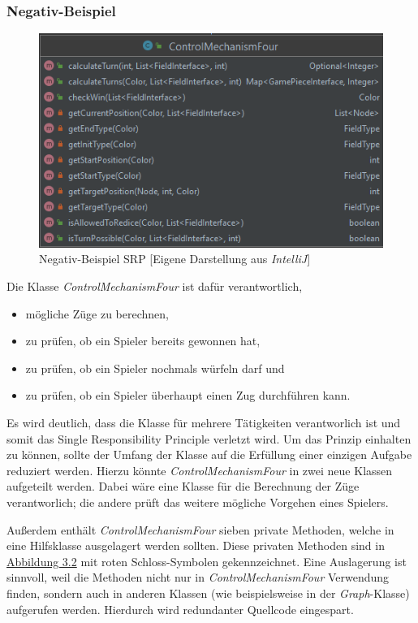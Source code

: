 \subsubsection{Negativ-Beispiel}
\begin{figure}[htbp]
\centering
\centerline{\includegraphics[scale=.6]{negativbeispiel_srp}}
\caption{Negativ-Beispiel SRP [Eigene Darstellung aus \emph{IntelliJ}]}
\label{fig:negativbeispiel_srp}
\end{figure}
\newpage
\noindent Die Klasse \emph{ControlMechanismFour} ist dafür verantwortlich, 
\begin{itemize}
\item mögliche Züge zu berechnen,
\item zu prüfen, ob ein Spieler bereits gewonnen hat,
\item zu prüfen, ob ein Spieler nochmals würfeln darf und
\item zu prüfen, ob ein Spieler überhaupt einen Zug durchführen kann.
\end{itemize}


\noindent Es wird deutlich, dass die Klasse für mehrere Tätigkeiten verantworlich ist und somit das Single Responsibility Principle verletzt wird. Um das Prinzip einhalten zu können, sollte der Umfang der Klasse auf die Erfüllung einer einzigen Aufgabe reduziert werden. Hierzu könnte \emph{ControlMechanismFour} in zwei neue Klassen aufgeteilt werden. Dabei wäre eine Klasse für die Berechnung der Züge verantworlich; die andere prüft das weitere mögliche Vorgehen eines Spielers. 

Außerdem enthält \emph{ControlMechanismFour} sieben private Methoden, welche in eine Hilfsklasse ausgelagert werden sollten. Diese privaten Methoden sind in \hyperref[fig:negativbeispiel_srp]{Abbildung 3.2} mit roten Schloss-Symbolen gekennzeichnet. Eine Auslagerung ist sinnvoll, weil die Methoden nicht nur in \emph{ControlMechanismFour} Verwendung finden, sondern auch in anderen Klassen (wie beispielsweise in der \emph{Graph}-Klasse) aufgerufen werden. Hierdurch wird redundanter Quellcode eingespart.

